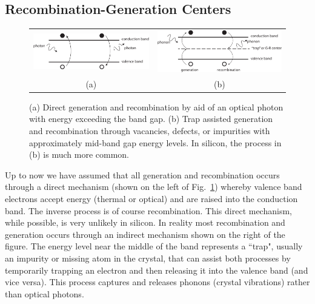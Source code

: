 \subsection{Recombination-Generation Centers}
\begin{figure}[tb]
\centering
\begin{tabular}{cc}
\includegraphics[width=.45\columnwidth]{gr_direct} &
\includegraphics[width=.45\columnwidth]{gr_indirect}\\
(a) & (b)\\
\end{tabular}
\caption{(a) Direct generation and recombination by aid of an optical photon with energy exceeding the band gap.  (b)  Trap assisted generation and recombination through vacancies, defects, or impurities with approximately mid-band gap energy levels.  In silicon, the process in (b) is much more common. } \label{fig:gr_direct}
\end{figure}
Up to now we have assumed that all generation and recombination occurs through a direct mechanism (shown on the left of Fig.~\ref{fig:gr_direct}) whereby valence band electrons accept energy (thermal or optical) and are raised into the conduction band.  The inverse process is of course recombination. This direct mechanism, while possible, is very unlikely in silicon. In reality most recombination and generation occurs through an indirect mechanism shown on the right of the figure.  The energy level near the middle of the band represents a ``trap", usually an impurity or missing atom in the crystal, that can assist both processes by temporarily trapping an electron and then releasing it into the valence band (and vice versa). This process captures and releases phonons (crystal vibrations) rather than optical photons.

